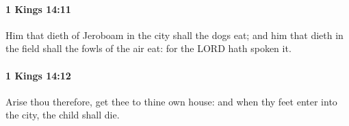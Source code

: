 		\paragraph{1 Kings 14:11} %
			\label{1KINGS-14-11}

			Him that dieth of Jeroboam in the city shall the dogs eat; and him that dieth in the field shall the fowls of the air eat: for the LORD hath spoken it.


		\paragraph{1 Kings 14:12} %
			\label{1KINGS-14-12}

			Arise thou therefore, get thee to thine own house: and when thy feet enter into the city, the child shall die.


